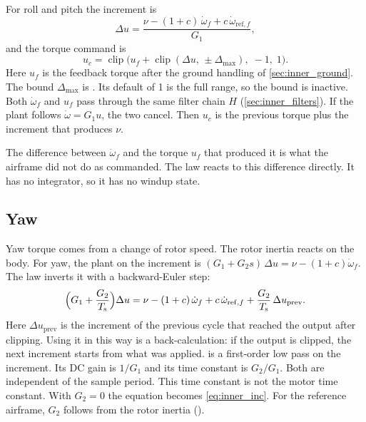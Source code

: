 For roll and pitch the increment is
\begin{equation}\label{eq:inner_inc}
  \Delta u = \frac{\nu - (1+c)\,\dot\omega_f + c\,\dot\omega_{\mathrm{ref},f}}{G_1} ,
\end{equation}
and the torque command is
\begin{equation}\label{eq:inner_cmd}
  u_c = \operatorname{clip}\bigl(u_f + \operatorname{clip}(\Delta u,\,\pm\Delta_{\max}),\; -1,\; 1\bigr) .
\end{equation}
Here $u_f$ is the feedback torque after the ground handling of \cref{sec:inner_ground}.
The bound $\Delta_{\max}$ is .
Its default of 1 is the full range, so the bound is inactive.
Both $\dot\omega_f$ and $u_f$ pass through the same filter chain $H$ (\cref{sec:inner_filters}).
If the plant follows $\dot\omega = G_1 u$, the two cancel.
Then $u_c$ is the previous torque plus the increment that produces $\nu$.

\begin{keyresult}
The difference between $\dot\omega_f$ and the torque $u_f$ that produced it is what the airframe did not do as commanded.
The law reacts to this difference directly.
It has no integrator, so it has no windup state.
\end{keyresult}

\subsection{Yaw}

Yaw torque comes from a change of rotor speed.
The rotor inertia reacts on the body.
For yaw, the plant on the increment is $(G_1 + G_2 s)\,\Delta u = \nu - (1+c)\dot\omega_f$.
The law inverts it with a backward-Euler step:
\begin{equation}\label{eq:inner_yaw}
  \Bigl(G_1 + \frac{G_2}{T_{\mathrm{s}}}\Bigr)\Delta u
  = \nu - (1+c)\,\dot\omega_f + c\,\dot\omega_{\mathrm{ref},f} + \frac{G_2}{T_{\mathrm{s}}}\,\Delta u_{\mathrm{prev}} .
\end{equation}
Here $\Delta u_{\mathrm{prev}}$ is the increment of the previous cycle that reached the output after clipping.
Using it in this way is a back-calculation: if the output is clipped, the next increment starts from what was applied.
 is a first-order low pass on the increment.
Its DC gain is $1/G_1$ and its time constant is $G_2/G_1$.
Both are independent of the sample period.
This time constant is not the motor time constant.
With $G_2=0$ the equation becomes \cref{eq:inner_inc}.
For the reference airframe, $G_2$ follows from the rotor inertia ().

